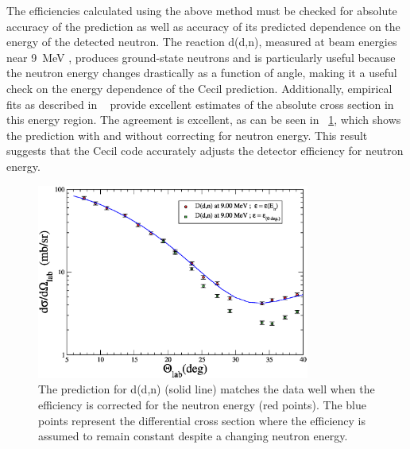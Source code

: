 The efficiencies calculated using the above method must be checked for absolute accuracy of the prediction as well as accuracy of its predicted dependence on the energy of the detected neutron.  The reaction d(d,n), measured at beam energies near 9~MeV \citep{deuteronCrossSections}, produces ground-state neutrons and is particularly useful because the neutron energy changes drastically as a function of angle, making it a useful check on the energy dependence of the Cecil prediction.  Additionally, empirical fits as described in {}~\citep{deuteronCrossSections} provide excellent estimates of the absolute cross section in this energy region.  The agreement is excellent, as can be seen in {\fig}~\ref{fig:DeuteriumMatch}, which shows the prediction with and without correcting for neutron energy.  This result suggests that the Cecil code accurately adjusts the detector efficiency for neutron energy.  
\begin{figure}[!htbp]
\centering
\includegraphics[width=0.8\textwidth]{figures/deuteriumMatch.eps}
\caption[Matching the detector efficiency with d(d,n).]{The prediction for d(d,n) (solid line) matches the data well when the efficiency is corrected for the neutron energy (red points).  The blue points represent the differential cross section where the efficiency is assumed to remain constant despite a changing neutron energy.}
\label{fig:DeuteriumMatch}
\end{figure}

